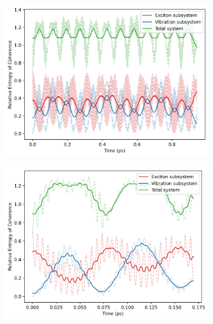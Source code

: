 \documentclass[12pt]{article}
\begin{document}
\begin{figure}[H]
    \centering
    \begin{subfigure}{0.49\textwidth}
        \centering
        \includegraphics[width=\linewidth]{Research Project/Code/results/ExVib/Closed/Envelope/coh_eg.png}
        \caption{}
        \label{fig:EVM_CQS_Coh_env_eg}
    \end{subfigure}
    \hfill
    \begin{subfigure}{0.49\textwidth}
        \centering
        \includegraphics[width=\linewidth]{Research Project/Code/results/ExVib/Closed/Fast/coh_eg.png}
        \caption{}
        \label{fig:EVM_CQS_Coh_fast_eg}
    \end{subfigure}
    
    \caption{}
    \label{fig:EVM_CQS_Coh_eg}
\end{figure}
\end{document}
